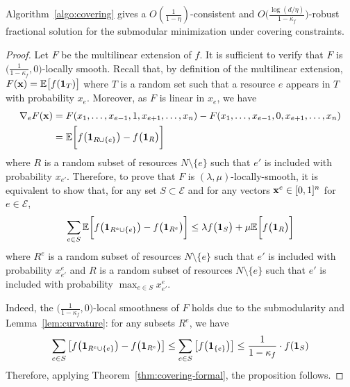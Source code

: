 \setcounter{theorem}{6}
\begin{proposition}
Algorithm~\ref{algo:covering} gives a
$O(\frac{1}{1 - \eta})$-consistent and $O\bigl( \frac{\log (d/\eta)}{1 - \kappa_{f}} \bigr)$-robust fractional  solution
for the submodular minimization under covering constraints.
\end{proposition}
\begin{proof}
Let $F$ be the multilinear extension of $f$.
It is sufficient to verify that $F$ is $\bigl(\frac{1}{1-\kappa_{f}},0\bigr)$-locally smooth.
Recall that, by definition of the multilinear extension,
$F(\mathbf{x}) = \mathbb{E} \bigl[ f(\mathbf{1}_{T})\bigr]$ where $T$ is a random set
such that a resource $e$ appears in $T$ with probability $x_{e}$. Moreover, as $F$ is linear in $x_{e}$, we have
%
\begin{align*}
\nabla_{e} F(\vect{x}) %
&= F(x_{1}, \ldots, x_{e-1}, 1, x_{e+1}, \ldots, x_{n}) - F(x_{1}, \ldots, x_{e-1}, 0, x_{e+1}, \ldots, x_{n}) \\
&= \mathbb{E} \biggl[ f\bigl(\vect{1}_{R \cup \{e\}}\bigr) - f\bigl(\vect{1}_{R}\bigr) \biggr]
\end{align*}
where $R$ is a random subset of resources $N \setminus \{e\}$ such that $e'$ is included with probability $x_{e'}$.
Therefore, to prove that $F$ is $(\lambda,\mu)$-locally-smooth, it is equivalent to show that,
for any set $S \subset \mathcal{E}$ and for any vectors $\mathbf{x}^{e} \in [0,1]^{n}$ for $e \in \mathcal{E}$,
%
\begin{equation*}	\label{eq:min-local-smooth-equiv}
\sum_{e \in S} \mathbb{E} \biggl[ f\bigl(\mathbf{1}_{R^{e} \cup \{e\}}\bigr) - f\bigl(\mathbf{1}_{R^{e}}\bigr) \biggr]
\leq \lambda f\bigl( \mathbf{1}_{S} \bigr) + \mu \mathbb{E} \biggl[ f\bigl(\mathbf{1}_{R}\bigr) \biggr]
\end{equation*}
%
where $R^{e}$ is a random subset of resources $N \setminus \{e\}$ such that $e'$ is included with probability $x^{e}_{e'}$
and $R$ is a random subset of resources $N \setminus \{e\}$ such that $e'$ is included with probability $\max_{e \in S} x^{e}_{e'}$.

Indeed, the
$\bigl(\frac{1}{1-\kappa_{f}},0\bigr)$-local smoothness of $F$ holds due to the submodularity and Lemma~\ref{lem:curvature}:
for any subsets $R^{e}$, we have
\begin{align*}
	\sum_{e \in S} \left[ f\bigl(\mathbf{1}_{R^{e} \cup \{e\}}\bigr) - f\bigl(\mathbf{1}_{R^{e}}\bigr) \right]
		\leq \sum_{e \in S} \left[ f\bigl(\mathbf{1}_{\{e\}}\bigr) \right]
		\leq \frac{1}{1 -\kappa_{f}} \cdot f(\mathbf{1}_{S})
\end{align*}
Therefore, applying Theorem~\ref{thm:covering-formal}, the proposition follows.
\end{proof}
